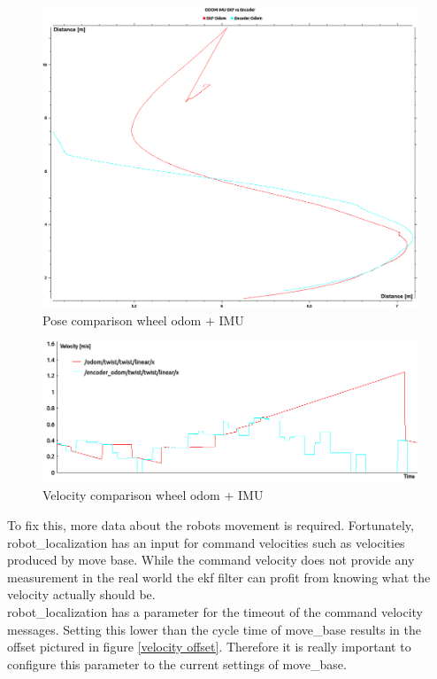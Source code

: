 \begin{figure} 
	\includegraphics[width=\textwidth]{Pictures/odom pose comp}
	\caption{Pose comparison wheel odom + IMU}
	\label{pose comparison wheel odom + IMU}

\end{figure}

\begin{figure} 
	\includegraphics[width=\textwidth]{Pictures/comparison odom}
	\caption{Velocity comparison wheel odom + IMU}
	\label{velocity comparison wheel odom + IMU}

\end{figure}


To fix this, more data about the robots movement is required. Fortunately, robot\_localization has an input for command velocities such as velocities produced by move base. While the command velocity does not provide any measurement in the real world the ekf filter can profit from knowing what the velocity actually should be.\\

robot\_localization has a parameter for the timeout of the command velocity messages. Setting this lower than the cycle time of move\_base results in the offset pictured in figure \ref{velocity offset}. Therefore it is really important to configure this parameter to the current settings of move\_base.

